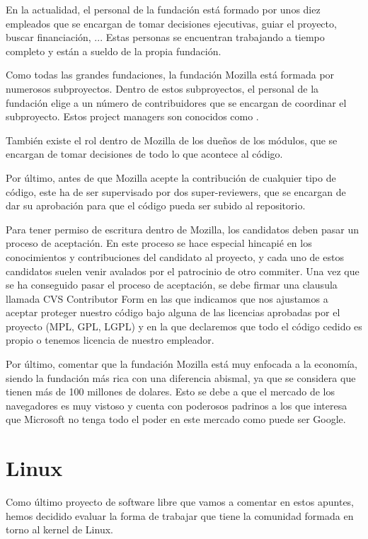 En la actualidad, el personal de la fundaci\'on est\'a formado por unos diez empleados que se encargan de tomar decisiones ejecutivas, guiar el proyecto, buscar financiaci\'on, ... Estas personas se encuentran trabajando a tiempo completo y est\'an a sueldo de la propia fundaci\'on.

Como todas las grandes fundaciones, la fundaci\'on Mozilla est\'a formada por numerosos subproyectos. Dentro de estos subproyectos, el personal de la fundaci\'on elige a un n\'umero de contribuidores que se encargan de coordinar el subproyecto. Estos project managers son conocidos como .

Tambi\'en existe el rol dentro de Mozilla de los dueños de los m\'odulos, que se encargan de tomar decisiones de todo lo que acontece al c\'odigo.

Por \'ultimo, antes de que Mozilla acepte la contribuci\'on de cualquier tipo de c\'odigo, este ha de ser supervisado por dos super-reviewers, que se encargan de dar su aprobaci\'on para que el c\'odigo pueda ser subido al repositorio.

Para tener permiso de escritura dentro de Mozilla, los candidatos deben pasar un proceso de aceptaci\'on. En este proceso se hace especial hincapi\'e en los conocimientos y contribuciones del candidato al proyecto, y cada uno de estos candidatos suelen venir avalados por el patrocinio de otro commiter. Una vez que se ha conseguido pasar el proceso de aceptaci\'on, se debe firmar una clausula llamada CVS Contributor Form en las que indicamos que nos ajustamos a aceptar proteger nuestro c\'odigo bajo alguna de las licencias aprobadas por el proyecto (MPL, GPL, LGPL) y en la que declaremos que todo el c\'odigo cedido es propio o tenemos licencia de nuestro empleador.

Por \'ultimo, comentar que la fundaci\'on Mozilla est\'a muy enfocada a la econom\'ia, siendo la fundaci\'on m\'as rica con una diferencia abismal, ya que se considera que tienen m\'as de 100 millones de dolares. Esto se debe a que el mercado de los navegadores es muy vistoso y cuenta con poderosos padrinos a los que interesa que Microsoft no tenga todo el poder en este mercado como puede ser Google.

\newpage
\section{Linux}
Como \'ultimo proyecto de software libre que vamos a comentar en estos apuntes, hemos decidido evaluar la forma de trabajar que tiene la comunidad formada en torno al kernel de Linux.

